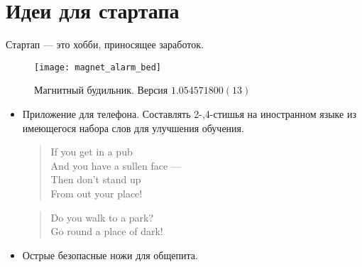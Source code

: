 \section{Идеи для стартапа}
Стартап --- это хобби, приносящее заработок.

\begin{figure}[ht!]
    \centering
    \texttt{[image: magnet\_alarm\_bed]}
    \caption{Магнитный будильник. Версия \( 1.054571800(13) \)}
\end{figure}

\begin{itemize}
\item Приложение для телефона. Составлять 2-,4-стишья на иностранном языке из имеющегося набора слов для улучшения обучения.\\
\begin{flushleft}
\begin{verse}
If you get in a pub\\
And you have a sullen face ---\\
Then don't stand up\\
From out your place!
\end{verse}

\begin{verse}
Do you walk to a park?\\
Go round a place of dark!
\end{verse}
\end{flushleft}
\item Острые безопасные ножи для общепита.
\end{itemize}

